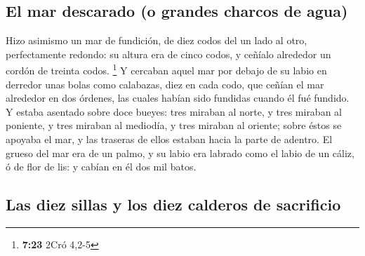 \hypertarget{el-mar-descarado-o-grandes-charcos-de-agua}{%
\subsection{El mar descarado (o grandes charcos de
agua)}\label{el-mar-descarado-o-grandes-charcos-de-agua}}

 Hizo asimismo un mar de fundición, de diez codos del un
lado al otro, perfectamente redondo: su altura era de cinco codos, y
ceñíalo alrededor un cordón de treinta codos. \footnote{\textbf{7:23}
  2Cró 4,2-5}  Y cercaban aquel mar por debajo de su
labio en derredor unas bolas como calabazas, diez en cada codo, que
ceñían el mar alrededor en dos órdenes, las cuales habían sido fundidas
cuando él fué fundido.  Y estaba asentado sobre doce
bueyes: tres miraban al norte, y tres miraban al poniente, y tres
miraban al mediodía, y tres miraban al oriente; sobre éstos se apoyaba
el mar, y las traseras de ellos estaban hacia la parte de adentro.
 El grueso del mar era de un palmo, y su labio era
labrado como el labio de un cáliz, ó de flor de lis: y cabían en él dos
mil batos.

\hypertarget{las-diez-sillas-y-los-diez-calderos-de-sacrificio}{%
\subsection{Las diez sillas y los diez calderos de
sacrificio}\label{las-diez-sillas-y-los-diez-calderos-de-sacrificio}}

